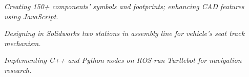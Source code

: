 \documentclass{resume}
\begin{document}
\textit{Creating 150+ components' symbols and footprints; enhancing CAD features using JavaScript.}
\begin{comment}
  Adjusted prioritization of design rules in layout constraint manager.
  Fixed incorrect drawing and positioning of constraint violation layout bodies.
  Re-factored event-listening logic for drawing nets in schematic editor.
  Corrected pin manager's oversight in tracking connection mappings.
  Enabled efficient BGA row enumeration during footprint generation.
\end{comment}

\textit{Designing in Solidworks two stations in assembly line for vehicle's seat track mechanism.}

\textit{Implementing C++ and Python nodes on ROS-run Turtlebot for navigation research.}
\end{document}

